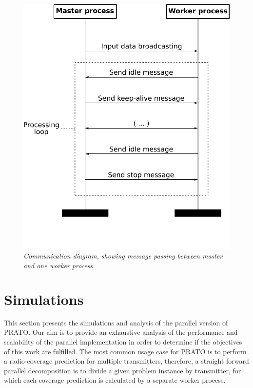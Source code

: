 \begin{figure}
\centering

\includegraphics[width=0.85\columnwidth]{04-framework_design_and_implementation/img/master_worker_communication_diagram}

\caption{\textit{\emph{Communication diagram, showing message passing between
master and one worker process.\label{fig:master_worker_communication}}}}
\end{figure}



\section{Simulations \label{sec:Simulations}}

This section presents the simulations and analysis of the parallel
version of PRATO. Our aim is to provide an exhaustive analysis of
the performance and scalability of the parallel implementation in
order to determine if the objectives of this work are fulfilled. The
most common usage case for PRATO is to perform a radio-coverage prediction
for multiple transmitters, therefore, a straight forward parallel
decomposition is to divide a given problem instance by transmitter,
for which each coverage prediction is calculated by a separate worker
process.

